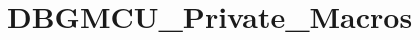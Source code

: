 \hypertarget{group___d_b_g_m_c_u___private___macros}{}\section{D\+B\+G\+M\+C\+U\+\_\+\+Private\+\_\+\+Macros}
\label{group___d_b_g_m_c_u___private___macros}

